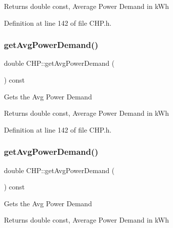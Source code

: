 \begin{DoxyReturn}{Returns}
double const, Average Power Demand in k\+Wh 
\end{DoxyReturn}


Definition at line 142 of file C\+H\+P.\+h.

\mbox{\label{class_c_h_p_a79f9a97a010669c5ffed9339c54a36c6}} 
\subsubsection{\texorpdfstring{get\+Avg\+Power\+Demand()}{getAvgPowerDemand()}\hspace{0.1cm}{\footnotesize\ttfamily [2/3]}}
{\footnotesize\ttfamily double C\+H\+P\+::get\+Avg\+Power\+Demand (\begin{DoxyParamCaption}{ }\end{DoxyParamCaption}) const\hspace{0.3cm}{\ttfamily [inline]}}

Gets the Avg Power Demand

\begin{DoxyReturn}{Returns}
double const, Average Power Demand in k\+Wh 
\end{DoxyReturn}


Definition at line 142 of file C\+H\+P.\+h.

\mbox{\label{class_c_h_p_a79f9a97a010669c5ffed9339c54a36c6}} 
\subsubsection{\texorpdfstring{get\+Avg\+Power\+Demand()}{getAvgPowerDemand()}\hspace{0.1cm}{\footnotesize\ttfamily [3/3]}}
{\footnotesize\ttfamily double C\+H\+P\+::get\+Avg\+Power\+Demand (\begin{DoxyParamCaption}{ }\end{DoxyParamCaption}) const\hspace{0.3cm}{\ttfamily [inline]}}

Gets the Avg Power Demand

\begin{DoxyReturn}{Returns}
double const, Average Power Demand in k\+Wh 
\end{DoxyReturn}


